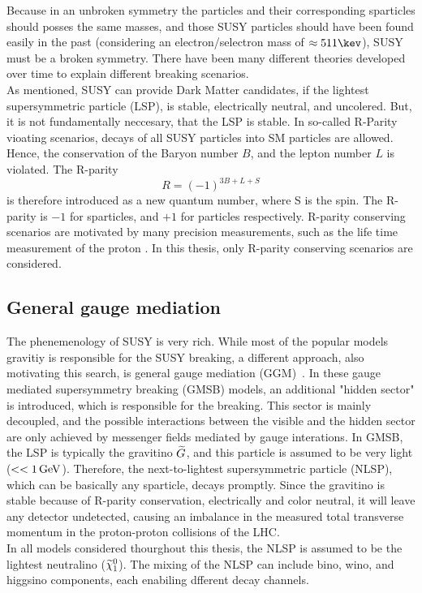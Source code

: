 Because in an unbroken symmetry the particles and their corresponding sparticles should posses the same masses, and those SUSY particles should have been found easily in the past (considering \eg an electron/selectron mass of $\approx511\kev$), SUSY must be a broken symmetry. There have been many different theories developed over time to explain different breaking scenarios.\\
As mentioned, SUSY can provide Dark Matter candidates, if the lightest supersymmetric particle (LSP), is stable, electrically neutral, and uncolered. But, it is not fundamentally neccesary, that the LSP is stable. In so-called R-Parity vioating scenarios, decays of all SUSY particles into SM particles are allowed. Hence, the conservation of the Baryon number $B$, and the lepton number $L$ is violated. The R-parity
\begin{equation}
 R = (-1)^{3B+L+S}
\end{equation}
is therefore introduced as a new quantum number, where S is the spin. The R-parity is $-1$ for sparticles, and $+1$ for particles respectively. R-parity conserving scenarios are motivated by many precision measurements, such as the life time measurement of the proton .
In this thesis, only R-parity conserving scenarios are considered.\\



\subsection{General gauge mediation}\label{sec:GGM}
The phenemenology of SUSY is very rich. While most of the popular models gravitiy is responsible for the SUSY breaking, a different approach, also motivating this search, is general gauge mediation (GGM)~. In these gauge mediated supersymmetry breaking (GMSB) models, an additional "hidden sector" is introduced, which is responsible for the breaking. This sector is mainly decoupled, and the possible interactions between the visible and the hidden sector are only achieved by messenger fields mediated by gauge interations. In GMSB, the LSP is typically the gravitino $\widetilde{G}$, and this particle is assumed to be very light ($<<1\,\text{Ge\hspace{-.08em}V}$). Therefore, the next-to-lightest supersymmetric particle (NLSP), which can be basically any sparticle, decays promptly. Since the gravitino is stable because of R-parity conservation, electrically and color neutral, it will leave any detector undetected, causing an imbalance in the measured total transverse momentum in \eg the proton-proton collisions of the LHC.\\
In all models considered thourghout this thesis, the NLSP is assumed to be the lightest neutralino ($\widetilde{\chi}^{0}_{1}$). The mixing of the NLSP can include bino, wino, and higgsino components, each enabiling dfferent decay channels.


